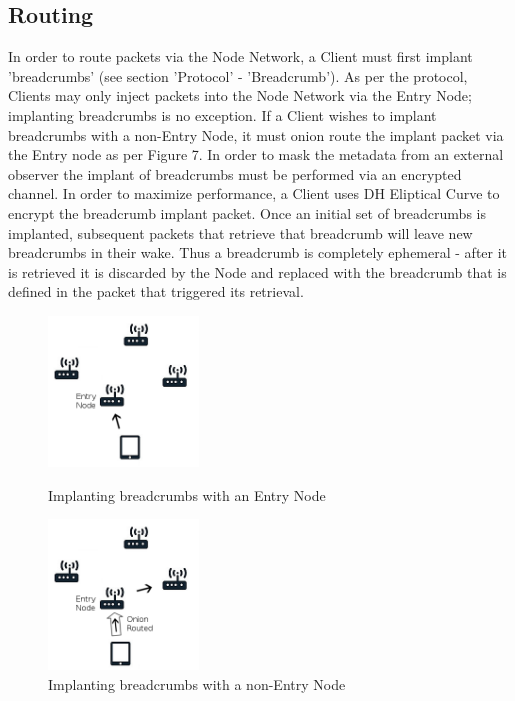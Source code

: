 \documentclass{article}
\begin{document}
\subsection{Routing}
In order to route packets via the Node Network, a Client must first implant 'breadcrumbs' (see section 'Protocol' - 'Breadcrumb'). As per the protocol, Clients may only
inject packets into the Node Network via the Entry Node; implanting breadcrumbs is no exception. If a Client wishes to implant breadcrumbs with a non-Entry Node, it 
must onion route the implant packet via the Entry node as per Figure 7. In order to mask the metadata from an external observer the implant of breadcrumbs must be performed 
via an encrypted channel. In order to maximize performance, a Client uses DH Eliptical Curve to encrypt the breadcrumb implant packet. Once an initial set of breadcrumbs is 
implanted, subsequent packets that retrieve that breadcrumb will leave new breadcrumbs in their wake. Thus a breadcrumb is completely ephemeral - after it is retrieved it is 
discarded by the Node and replaced with the breadcrumb that is defined in the packet that triggered its retrieval.
\begin{figure}[h]
\centering
\begin{minipage}{.4\textwidth}
  	\centering
  	\includegraphics[width=4cm,height=4cm,keepaspectratio]{img/BreadcrumbPlacement.png}
	\caption{Implanting breadcrumbs with an Entry Node}
\end{minipage}
\hspace{1cm}
\begin{minipage}{.4\textwidth}
  	\centering
	\includegraphics[width=4cm,height=4cm,keepaspectratio]{img/BreadcrumbPlacement1.png}
	\caption{Implanting breadcrumbs with a non-Entry Node}
\end{minipage}
\end{figure}
\end{document}
